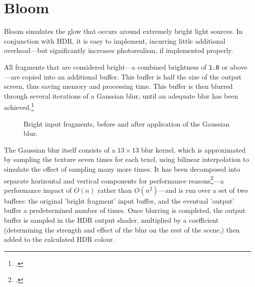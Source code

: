 \documentclass[11pt, oneside]{report}
\begin{document}
\section{Bloom}
Bloom simulates the glow that occurs around extremely bright light sources. In conjunction with \gls{HDR}, it is easy to implement, incurring little additional overhead---but significantly increases photorealism, if implemented properly.

All fragments that are considered bright---a combined brightness of \texttt{1.0} or above---are copied into an additional buffer. This buffer is half the size of the output screen, thus saving memory and processing time. This buffer is then blurred through several iterations of a Gaussian blur, until an adequate blur has been achieved.\footcite{gpupro-hdr}

\begin{figure}[!htbp]
  \centering
  \hfill
  \caption{Bright input fragments, before and after application of the Gaussian blur.}
\end{figure}

The Gaussian blur itself consists of a $13 \times 13$ blur kernel, which is approximated by sampling the texture seven times for each \gls{texel}, using bilinear interpolation to simulate the effect of sampling many more times. It has been decomposed into separate horizontal and vertical components for performance reasons\footcite{intel-blur}---a performance impact of $O(n)$ rather than $O(n^2)$---and is run over a set of two buffers: the original 'bright fragment' input buffer, and the eventual 'output' buffer a predetermined number of times. Once blurring is completed, the output buffer is sampled in the \gls{HDR} output shader, multiplied by a coefficient (determining the strength and effect of the blur on the rest of the scene,) then added to the calculated \gls{HDR} colour.
\end{document}
